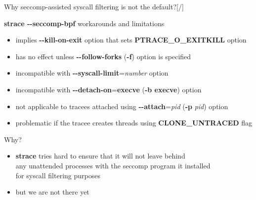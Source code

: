 \documentclass[unicode,aspectratio=169,xcolor={table,dvipsnames,usenames}]{beamer}
\begin{document}
\begin{frame}{\Large Why seccomp-assisted syscall filtering is not the default?\hfill [\insertframenumber/\inserttotalframenumber]}
\large
\begin{block}{\textbf{strace -{}-seccomp-bpf} workarounds and limitations}
\begin{itemize}
	\item implies \textbf{-{}-kill-on-exit} option that sets \textbf{PTRACE\_O\_EXITKILL} option
	\item has no effect unless \textbf{-{}-follow-forks} (\textbf{-f}) option is specified
	\item incompatible with \textbf{-{}-syscall-limit}=\textit{number} option
	\item incompatible with \textbf{-{}-detach-on}=\textbf{execve} (\textbf{-b execve}) option
	\item not applicable to tracees attached using \textbf{-{}-attach}=\textit{pid} (\textbf{-p} \textit{pid}) option
	\item problematic if the tracee creates threads using \textbf{CLONE\_UNTRACED} flag
\end{itemize}
\end{block}

\begin{block}{Why?}
\begin{itemize}
	\item \textbf{strace} tries hard to ensure that it will not leave behind \\
		any unattended processes with the seccomp program it installed \\
		for syscall filtering purposes
	\item but we are not there yet
\end{itemize}
\end{block}
\end{frame}
\end{document}
